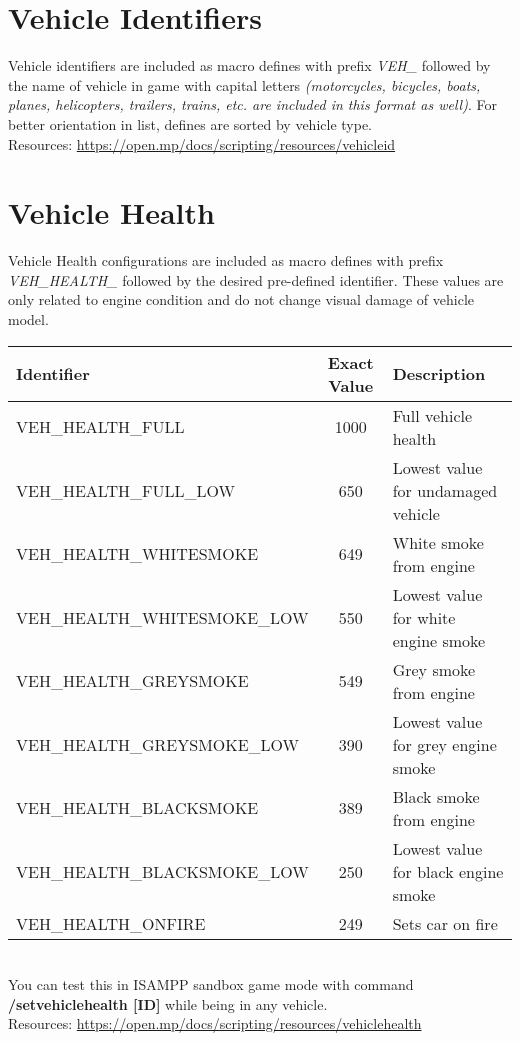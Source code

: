 \documentclass{article}
\begin{document}
\section{Vehicle Identifiers}
Vehicle identifiers are included as macro defines with prefix \textit{VEH\_} followed by the name of vehicle in game with capital letters \textit{(motorcycles, bicycles, boats, planes, helicopters, trailers, trains, etc. are included in this format as well)}. For better orientation in list, defines are sorted by vehicle type.
\bigskip
\\Resources: \url{https://open.mp/docs/scripting/resources/vehicleid}


\newpage
\section{Vehicle Health}
\begin{sloppypar}
Vehicle Health configurations are included as macro defines with prefix \textit{VEH\_HEALTH\_} followed by the desired pre-defined identifier. These values are only related to engine condition and do not change visual damage of vehicle model.
\end{sloppypar}
\bigskip
\noindent\begin{tabular}{ |l|c|l| } 
\hline
Identifier & Exact Value & Description \\
\hline
VEH\_HEALTH\_FULL & 1000 & Full vehicle health \\ 
VEH\_HEALTH\_FULL\_LOW & 650 &  Lowest value for undamaged vehicle \\ 
VEH\_HEALTH\_WHITESMOKE & 649 & White smoke from engine \\ 
VEH\_HEALTH\_WHITESMOKE\_LOW & 550 & Lowest value for white engine smoke \\ 
VEH\_HEALTH\_GREYSMOKE & 549 & Grey smoke from engine \\ 
VEH\_HEALTH\_GREYSMOKE\_LOW & 390 & Lowest value for grey engine smoke\\ 
VEH\_HEALTH\_BLACKSMOKE & 389 & Black smoke from engine \\ 
VEH\_HEALTH\_BLACKSMOKE\_LOW & 250 & Lowest value for black engine smoke \\ 
VEH\_HEALTH\_ONFIRE & 249 & Sets car on fire \\
\hline
\end{tabular}
\bigskip
\\You can test this in ISAMPP sandbox game mode with command \textbf{/setvehiclehealth [ID]} while being in any vehicle.
\bigskip
\\Resources: \url{https://open.mp/docs/scripting/resources/vehiclehealth}
\end{document}
